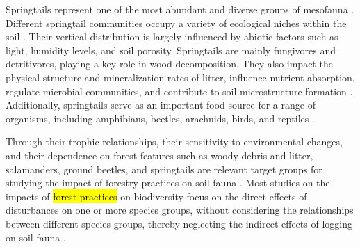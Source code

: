 Springtails represent one of the most abundant and diverse groups of mesofauna \citep{rusekBiodiversityCollembolaTheir1998}. 
Different springtail communities occupy a variety of ecological niches within the soil \citep{pongeVerticalDistributionCollembola2000}. 
Their vertical distribution is largely influenced by abiotic factors such as light, humidity levels, and soil porosity. 
Springtails are mainly fungivores and detritivores, playing a key role in wood decomposition. 
They also impact the physical structure and mineralization rates of litter, influence nutrient absorption, 
regulate microbial communities, and contribute to soil microstructure formation \citep{Petersen1982comparativeanalysis,Neher2012Linkinginvertebrate,Maass2015Functionalrole,Potapov2016Connectingtaxonomy}. 
Additionally, springtails serve as an important food source for a range of organisms, including amphibians, beetles, arachnids, birds, and reptiles \citep{Burton1975Energyflow,Bauer1982Predationcarabid,rusekBiodiversityCollembolaTheir1998}.

Through their trophic relationships, their sensitivity to environmental changes, and their dependence on forest features such as woody debris and litter, 
salamanders, ground beetles, and springtails are relevant target groups for studying the impact of forestry practices on soil fauna \citep{Salmon2008Relationshipssoil}. 
Most studies on the impacts of \hl{forest practices} on biodiversity focus on the direct effects of disturbances on one or more species groups, 
without considering the relationships between different species groups, thereby neglecting the indirect effects of logging on soil fauna \citep{josephIntegratingOccupancyModels2016,Pollierer2021Diversityfunctional,Kudrin2023metaanalysiseffects}. 

